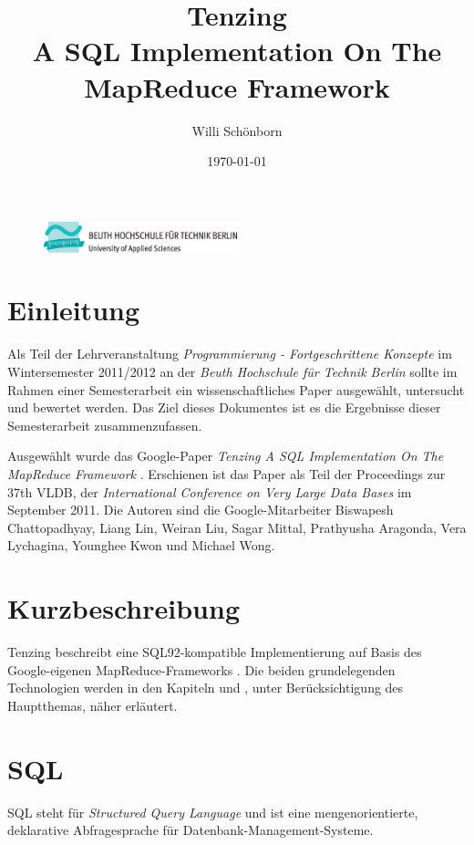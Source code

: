 \documentclass[a4paper]{article}
\title{Tenzing \\ A SQL Implementation On The MapReduce Framework}
\author{Willi Schönborn}
\date{\today}
\begin{document}
\begin{figure}[H]
\centering
\includegraphics[width=0.5\textwidth]{beuth.eps}
\maketitle
\end{figure}

\newpage

\tableofcontents

\newpage

\section{Einleitung}
Als Teil der Lehrveranstaltung \textit{Programmierung - Fortgeschrittene Konzepte} im Wintersemester 2011/2012 an der \textit{Beuth Hochschule für Technik Berlin} sollte im Rahmen einer Semesterarbeit ein wissenschaftliches Paper ausgewählt, untersucht und bewertet werden. Das Ziel dieses Dokumentes ist es die Ergebnisse dieser Semesterarbeit zusammenzufassen.

Ausgewählt wurde das Google-Paper \textit{Tenzing A SQL Implementation On The MapReduce Framework} \cite{TENZING}. Erschienen ist das Paper als Teil der Proceedings zur 37th VLDB, der \textit{International Conference on Very Large Data Bases} im September 2011. Die Autoren sind die Google-Mitarbeiter Biswapesh Chattopadhyay, Liang Lin, Weiran Liu, Sagar Mittal, Prathyusha Aragonda, Vera Lychagina, Younghee Kwon und Michael Wong.

\section{Kurzbeschreibung}
Tenzing beschreibt eine SQL92-kompatible Implementierung auf Basis des Google-eigenen MapReduce-Frameworks \cite{MAPREDUCE}. Die beiden grundelegenden Technologien werden in den Kapiteln \textit{} und \textit{}, unter Berücksichtigung des Hauptthemas, näher erläutert.

\newpage

\section{SQL}
\label{sql}

SQL steht für \textit{Structured Query Language} und ist eine mengenorientierte, deklarative Abfragesprache für Datenbank-Management-Systeme.
\end{document}
